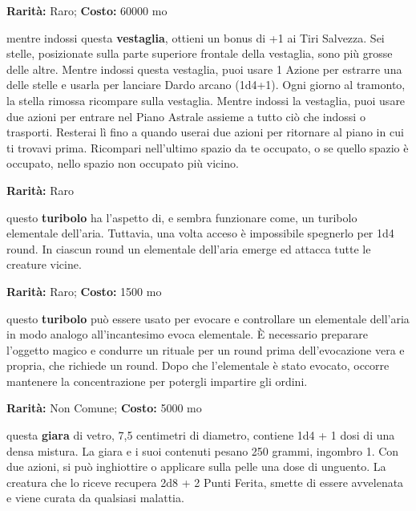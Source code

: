 \begin{multicols}{2}

\textbf{Rarità:} Raro; \textbf{Costo:} 60000 mo

mentre indossi questa \textbf{vestaglia}, ottieni un bonus di +1 ai Tiri Salvezza. Sei stelle, posizionate sulla parte superiore frontale della vestaglia, sono più grosse delle altre. Mentre indossi questa vestaglia, puoi usare 1 Azione per estrarre una delle stelle e usarla per lanciare Dardo arcano (1d4+1). Ogni giorno al tramonto, la stella rimossa ricompare sulla vestaglia. Mentre indossi la vestaglia, puoi usare due azioni per entrare nel Piano Astrale assieme a tutto ciò che indossi o trasporti. Resterai lì fino a quando userai due azioni per ritornare al piano in cui ti trovavi prima. Ricompari nell'ultimo spazio da te occupato, o se quello spazio è occupato, nello spazio non occupato più vicino.


\textbf{Rarità:} Raro

questo \textbf{turibolo} ha l'aspetto di, e sembra funzionare come, un turibolo elementale dell'aria. Tuttavia, una volta acceso è impossibile spegnerlo per 1d4 round. In ciascun round un elementale dell'aria emerge ed attacca tutte le creature vicine.


\textbf{Rarità:} Raro; \textbf{Costo:} 1500 mo

questo \textbf{turibolo} può essere usato per evocare e controllare un elementale dell'aria in modo analogo all'incantesimo evoca elementale. È necessario preparare l'oggetto magico e condurre un rituale per un round prima dell'evocazione vera e propria, che richiede un round. Dopo che l'elementale è stato evocato, occorre mantenere la concentrazione per potergli impartire gli ordini.


\textbf{Rarità:} Non Comune; \textbf{Costo:} 5000 mo

questa \textbf{giara} di vetro, 7,5 centimetri di diametro, contiene 1d4 + 1 dosi di una densa mistura. La giara e i suoi contenuti pesano 250 grammi, ingombro 1. Con due azioni, si può inghiottire o applicare sulla pelle una dose di unguento. La creatura che lo riceve recupera 2d8 + 2 Punti Ferita, smette di essere avvelenata e viene curata da qualsiasi malattia.



\end{multicols}
